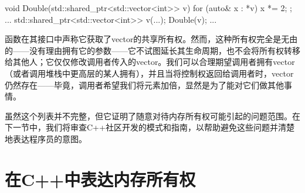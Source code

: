 \begin{code}
void Double(std::shared_ptr<std::vector<int>> v) {
  for (auto& x : *v) {
    x *= 2;
  }
};
...
std::shared_ptr<std::vector<int>> v(...);
Double(v);
...
\end{code}

函数在其接口中声称它获取了vector的共享所有权。然而，这种所有权完全是无由的——没有理由拥有它的参数——它不试图延长其生命周期，也不会将所有权转移给其他人；它仅仅修改调用者传入的vector。我们可以合理期望调用者拥有vector（或者调用堆栈中更高层的某人拥有），并且当将控制权返回给调用者时，vector仍然存在——毕竟，调用者希望我们将元素加倍，显然是为了能对它们做其他事情。

虽然这个列表并不完整，但它证明了随意对待内存所有权可能引起的问题范围。在下一节中，我们将审查C++社区开发的模式和指南，以帮助避免这些问题并清楚地表达程序员的意图。

\section{在C++中表达内存所有权}

